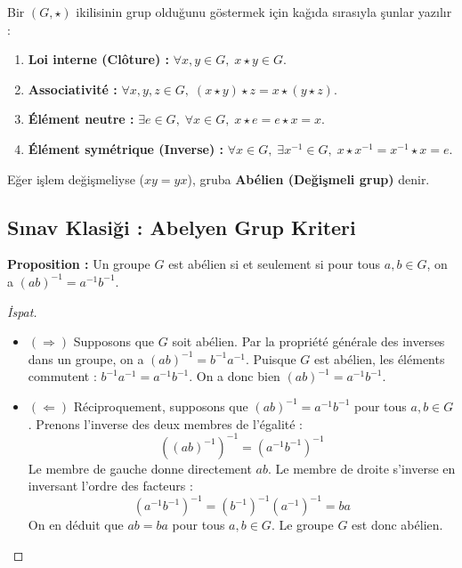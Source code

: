 \documentclass[11pt,a4paper]{article}
\begin{document}
\begin{tcolorbox}[colback=yellow!5!white,colframe=orange!80!black,title=Grup Aksiyomları (Axiomes de Groupe)]
Bir $(G, \star)$ ikilisinin grup olduğunu göstermek için kağıda sırasıyla şunlar yazılır :
\begin{enumerate}
    \item \textbf{Loi interne (Clôture) :} $\forall x, y \in G, \; x \star y \in G$.
    \item \textbf{Associativité :} $\forall x, y, z \in G, \; (x \star y) \star z = x \star (y \star z)$.
    \item \textbf{Élément neutre :} $\exists e \in G, \; \forall x \in G, \; x \star e = e \star x = x$.
    \item \textbf{Élément symétrique (Inverse) :} $\forall x \in G, \; \exists x^{-1} \in G, \; x \star x^{-1} = x^{-1} \star x = e$.
\end{enumerate}
Eğer işlem değişmeliyse ($xy = yx$), gruba \textbf{Abélien (Değişmeli grup)} denir.
\end{tcolorbox}

\subsection*{Sınav Klasiği : Abelyen Grup Kriteri}
\textbf{Proposition :} Un groupe $G$ est abélien si et seulement si pour tous $a, b \in G$, on a $(ab)^{-1} = a^{-1}b^{-1}$.

\begin{proof}[İspat]
\begin{itemize}
    \item $(\Longrightarrow)$ Supposons que $G$ soit abélien.  
    Par la propriété générale des inverses dans un groupe, on a $(ab)^{-1} = b^{-1}a^{-1}$.  
    Puisque $G$ est abélien, les éléments commutent : $b^{-1}a^{-1} = a^{-1}b^{-1}$.  
    On a donc bien $(ab)^{-1} = a^{-1}b^{-1}$.
    
    \item $(\Longleftarrow)$ Réciproquement, supposons que $(ab)^{-1} = a^{-1}b^{-1}$ pour tous $a, b \in G$.  
    Prenons l'inverse des deux membres de l'égalité :
    \[ ((ab)^{-1})^{-1} = (a^{-1}b^{-1})^{-1} \]
    Le membre de gauche donne directement $ab$.  
    Le membre de droite s'inverse en inversant l'ordre des facteurs :
    \[ (a^{-1}b^{-1})^{-1} = (b^{-1})^{-1}(a^{-1})^{-1} = ba \]
    On en déduit que $ab = ba$ pour tous $a, b \in G$.  
    Le groupe $G$ est donc abélien.
\end{itemize}
\end{proof}
\end{document}
